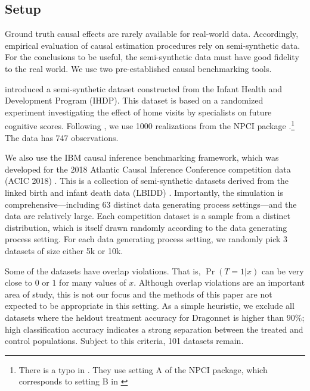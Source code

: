 \documentclass{article}
\begin{document}
\subsection{Setup}
Ground truth causal effects are rarely available for real-world data.
Accordingly, empirical evaluation of causal estimation procedures rely on semi-synthetic data.
For the conclusions to be useful, the semi-synthetic data must have good fidelity to the real world.
We use two pre-established causal benchmarking tools.

\citet{hill2011bayesian} introduced a semi-synthetic dataset constructed from the Infant Health and Development Program (IHDP).
This dataset is based on a randomized experiment investigating the effect of home visits by specialists on future cognitive scores.
Following \cite{shalit2016estimating}, we use 1000 realizations from the NPCI package \cite{dorie2016npci}.\footnote{There is a typo in \citet{shalit2016estimating}. They use setting A of the NPCI package, which corresponds to setting B in
\citet{hill2011bayesian}} The data has 747 observations.


We also use the IBM causal inference benchmarking framework, which was developed for the 2018 Atlantic Causal Inference Conference competition data (ACIC 2018) \cite{Shimoni:Yanover:Karavani:Goldschmnidt:2018}.
This is a collection of semi-synthetic datasets derived from the linked birth and infant death data (LBIDD) \cite{LBIDD}.
Importantly, the simulation is comprehensive---including 63 distinct data generating process settings---and
the data are relatively large.
Each competition dataset is a sample from a distinct distribution, which is itself drawn randomly according to the data generating process setting.
For each data generating process setting, we randomly pick 3 datasets of size either 5k or 10k.

Some of the datasets have overlap violations.
That is, $\Pr(T=1|x)$ can be very close to $0$ or $1$ for many values of $x$.
Although overlap violations are an important area of study,
this is not our focus and the methods of this paper are not expected to be appropriate in this setting.
As a simple heuristic, we exclude all datasets where the heldout treatment accuracy for Dragonnet is higher than $90\%$; high classification accuracy indicates a strong separation between the treated and control populations.
Subject to this criteria, 101 datasets remain.
\end{document}
